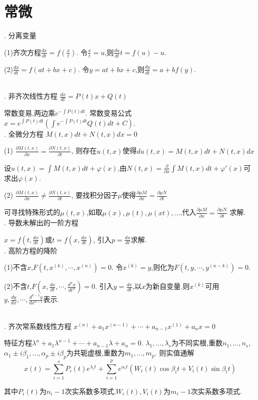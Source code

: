 \documentclass[UTF8]{ctexart}
\begin{document}
\section{常微}

. 分离变量 \par
(1)齐次方程$\frac{dx}{dt}=f(\frac{x}{t})$. 令$\frac{x}{t}=u$,则$\frac{du}{dt}t=f(u)-u$.\par
(2)$\frac{dx}{dt}=f(at+bx+c)$. 令$y=at+bx+c$,则$\frac{dy}{dt}=a+bf(y)$.\par
~\\

. 非齐次线性方程 $\frac{dx}{dt}=P(t)x+Q(t)$\par
常数变易,两边乘$e^{-\int P(t)dt}$. 常数变易公式$x=e^{\int P(t)dt}(\int e^{-\int P(t)dt}Q(t)dt+C)$.
~\\


. 全微分方程 $M(t,x)dt+N(t,x)dx=0$ \par
(1) $\frac{\partial M(t,x)}{\partial x}=\frac{\partial N(t,x)}{\partial t}$, 则存在$u(t,x)$使得$du(t,x)=M(t,x)dt+N(t,x)dx$\par
设$u(t,x)=\int M(t,x)dt+\varphi(x)$,由$N(t,x)=\frac{\partial }{\partial x}\int M(t,x)dt+\varphi'(x)$可求出$\varphi(x)$. \par
(2) $\frac{\partial M(t,x)}{\partial x} \neq \frac{\partial N(t,x)}{\partial t}$,
要找积分因子$\mu$使得$\frac{\partial \mu M}{\partial x}=\frac{\partial \mu N}{\partial t}$ \par
可寻找特殊形式的$\mu(t,x) $,如取$\mu (x),\mu (t),\mu (xt),\dots $,代入$\frac{\partial \mu M}{\partial x}=\frac{\partial \mu N}{\partial t}$ 求解.
~\\


. 导数未解出的一阶方程 \par
$x=f(t,\frac{dx}{dt})$或$t=f(x,\frac{dx}{dt})$,
引入$p=\frac{dx}{dt}$求解.
~\\


. 高阶方程的降阶 \par
(1)不含$x$,$F\left(t, x^{(k)}, \cdots, x^{(n)}\right)=0$.
令$x^{(k)}=y$,则化为$F\left(t, y, \cdots, y^{(n-k)}\right)=0 $.\par
(2)不含$t$,$F\left(x, \frac{d x}{d t}, \cdots, \frac{d^{n} x}{d t^{n}}\right)=0$.
引入$y=\frac{dx}{dt}$,以$x$为新自变量.则$x^{(k)}$可用$y,\frac{dy}{dx},\cdots,\frac{d^{k-1}y}{dx^{k-1}}$表示.\par
~\\

. 齐次常系数线性方程
$x^{(n)}+a_1x^{(n-1)}+\cdots +a_{n-1}x^{(1)}+a_nx=0$ \par
特征方程$\lambda ^{n}+a_1\lambda^{n-1}+\cdots +a_{n-1}\lambda+a_n=0$.
$\lambda_1,\dots ,\lambda_s$为不同实根,重数$n_1,\dots ,n_s$,
$\alpha_1 \pm i\beta_1,\dots ,\alpha_p \pm i\beta_p$为共轭虚根,重数为$m_1,\dots ,m_p$.
则实值通解$$x(t)=\sum_{i=1}^s P_i(t)e^{\lambda_i t} + \sum_{i=1}^p e^{\alpha_i t}(W_i(t)\cos \beta_i t +V_i(t) \sin\beta_i t)$$ \par
其中$P_i(t)$为$n_i-1$次实系数多项式,$W_i(t),V_i(t)$为$m_i-1$次实系数多项式.
~\\
\end{document}
